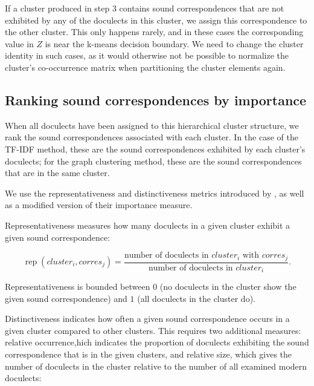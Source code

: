 \documentclass[a4paper]{article}
\begin{document}

If a cluster produced in step 3 contains
sound correspondences that are not exhibited
by any of the doculects in this cluster,
we assign this correspondence to the other cluster.
This only happens rarely, and in these cases the corresponding
value in $Z$ is near the k-means decision boundary.
We need to change the cluster identity in such cases,
as it would otherwise not be possible to normalize
the cluster's co-occurrence matrix when partitioning
the cluster elements again.

\subsection{Ranking sound correspondences by importance}

When all doculects have been assigned to this hierarchical cluster structure,
we rank the sound correspondences associated with each cluster.
In the case of the TF-IDF method, these are
the sound correspondences exhibited by each cluster's doculects;
for the graph clustering method,
these are the sound correspondences that are in the same cluster.

We use the representativeness and distinctiveness metrics
introduced by \citet{wieling2011bipartite},
as well as a modified version of their importance measure.

Representativeness measures how many doculects in a given cluster
exhibit a given sound correspondence:

\begin{equation*}
\operatorname{rep}(cluster_i, corres_j) = 
\frac{\text{number of doculects in } cluster_i \text{ with }  corres_j}
{\text{number of doculects in }  cluster_i}
.
\end{equation*}

Representativeness is bounded between
$0$ (no doculects in the cluster show the given sound correspondence)
and $1$ (all doculects in the cluster do).

Distinctiveness indicates how often a given sound correspondence
occurs in a given cluster compared to other clusters. 
This requires two additional measures:
relative occurrence,hich indicates the proportion
of doculects exhibiting the sound correspondence
that is in the given clusters,
and relative size, which gives the number of doculects 
in the cluster relative to the number of all examined modern doculects:
\end{document}
